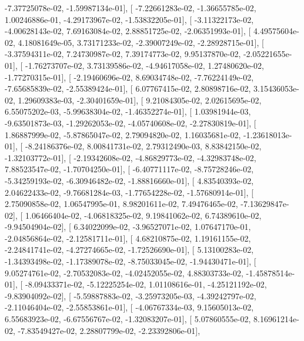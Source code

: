 \documentclass{article}
\begin{document}
         -7.37725078e-02,  -1.59987134e-01],
       [ -7.22661283e-02,  -1.36655785e-02,   1.00246886e-01,
         -4.29173967e-02,  -1.53832205e-01],
       [ -3.11322173e-02,  -4.00628143e-02,   7.69163084e-02,
          2.88851725e-02,  -2.06351993e-01],
       [  4.49575604e-02,   4.18081649e-05,   3.73171233e-02,
         -2.39007249e-02,  -2.28928715e-01],
       [ -3.37594311e-02,   7.24730987e-02,   7.39174773e-02,
          9.95137870e-02,  -2.05221655e-01],
       [ -1.76273707e-02,   3.73139586e-02,  -4.94617058e-02,
          1.27480620e-02,  -1.77270315e-01],
       [ -2.19460696e-02,   8.69034748e-02,  -7.76224149e-02,
         -7.65685839e-02,  -2.55389424e-01],
       [  6.07767415e-02,   2.80898716e-02,   3.15436053e-02,
          1.29609383e-03,  -2.30401659e-01],
       [  9.21084305e-02,   2.02615695e-02,   6.55075202e-03,
         -5.99638304e-02,  -1.46352274e-01],
       [  1.03981944e-03,  -9.63501873e-03,  -1.29262053e-02,
         -4.05740608e-02,  -2.27830819e-01],
       [  1.86887999e-02,  -5.87865047e-02,   2.79094820e-02,
          1.16035681e-02,  -1.23618013e-01],
       [ -8.24186376e-02,   8.00841731e-02,   2.79312490e-03,
          8.83842150e-02,  -1.32103772e-01],
       [ -2.19342608e-02,  -4.86829773e-02,  -4.32983748e-02,
          7.88523547e-02,  -1.70704250e-01],
       [ -6.40771117e-02,  -8.75728246e-02,  -5.34259193e-02,
         -6.30946482e-02,  -1.88816660e-01],
       [  4.83540393e-02,   2.04622433e-02,  -9.76681284e-03,
         -1.77654228e-02,  -1.57680914e-01],
       [  2.75090858e-02,   1.06547995e-01,   8.98201611e-02,
          7.49476465e-02,  -7.13629847e-02],
       [  1.06466404e-02,  -4.06818325e-02,   9.19841062e-02,
          6.74389610e-02,  -9.94504904e-02],
       [  6.34022099e-02,  -3.96527071e-02,   1.07647170e-01,
         -2.04856864e-02,  -2.12581711e-01],
       [  4.68210875e-02,   1.19161155e-02,  -2.24841741e-02,
         -4.27274665e-02,  -1.72526690e-01],
       [  5.13100283e-02,  -1.34393498e-02,  -1.17389078e-02,
         -8.75033045e-02,  -1.94430471e-01],
       [  9.05274761e-02,  -2.70532083e-02,  -4.02452055e-02,
          4.88303733e-02,  -1.45878514e-01],
       [ -8.09433371e-02,  -5.12225254e-02,   1.01108616e-01,
         -4.25121192e-02,  -9.83904092e-02],
       [ -5.59887883e-02,  -3.25973205e-03,  -4.39242797e-02,
         -2.11046404e-02,  -2.55853861e-01],
       [ -4.06767334e-03,   9.15605013e-02,   6.55683923e-02,
         -6.67556767e-02,  -1.32083207e-01],
       [  5.07860555e-02,   8.16961214e-02,  -7.83549427e-02,
          2.28807799e-02,  -2.23392806e-01],
\end{document}
